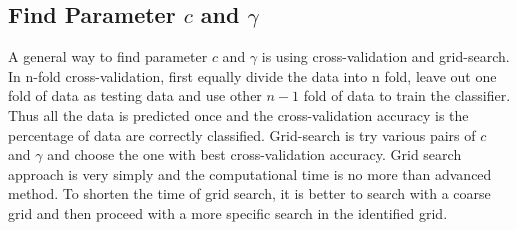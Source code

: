 \subsection{Find Parameter $c$ and $\gamma$}
A general way to find parameter $c$ and $\gamma$ is using cross-validation and grid-search. In n-fold cross-validation, first equally divide the data into n fold, leave out one fold of data as testing data and use other $n-1$ fold of data to train the classifier. Thus all the data is predicted once and the cross-validation accuracy is the percentage of data are correctly classified. 
Grid-search is try various pairs of $c$ and $\gamma$ and choose the one with best cross-validation accuracy. Grid search approach is very simply and the computational time is no more than advanced method. To shorten the time of grid search, it is better to search with a coarse grid and then proceed with a more specific search in the identified grid.
